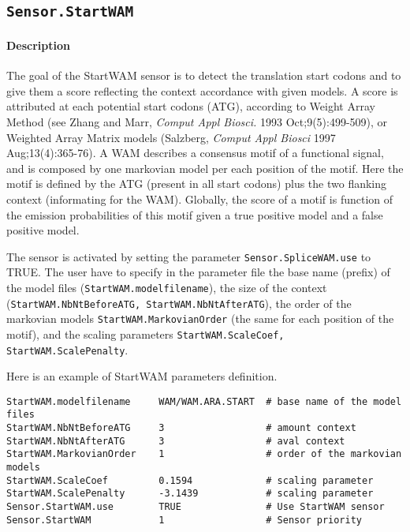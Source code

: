 
\subsection{\texttt{Sensor.StartWAM}}

\paragraph{Description}

The goal of the StartWAM sensor is to detect the translation start
codons and to give them a score reflecting the context accordance with
given models. A score is attributed at each potential start codons
(ATG), according to Weight Array Method (see Zhang and Marr, {\em
  Comput Appl Biosci.} 1993 Oct;9(5):499-509), or Weighted Array
Matrix models (Salzberg, {\em Comput Appl Biosci} 1997
Aug;13(4):365-76). A WAM describes a consensus motif of a functional
signal, and is composed by one markovian model per each position of
the motif. Here the motif is defined by the ATG (present in all start
codons) plus the two flanking context (informating for the WAM).
Globally, the score of a motif is function of the emission
probabilities of this motif given a true positive model and a false
positive model.

The sensor is activated by setting the parameter
\texttt{Sensor.SpliceWAM.use} to TRUE.  The user have to specify in
the parameter file the base name (prefix) of the model files
(\texttt{StartWAM.modelfilename}), the size of the context
(\texttt{StartWAM.NbNtBeforeATG, StartWAM.NbNtAfterATG}), the order of
the markovian models \texttt{StartWAM.MarkovianOrder} (the same for
each position of the motif), and the scaling parameters
\texttt{StartWAM.ScaleCoef, StartWAM.ScalePenalty}.

Here is an example of StartWAM parameters definition.
\begin{Verbatim}[fontsize=\small]
StartWAM.modelfilename     WAM/WAM.ARA.START  # base name of the model files
StartWAM.NbNtBeforeATG     3                  # amount context
StartWAM.NbNtAfterATG      3                  # aval context
StartWAM.MarkovianOrder    1                  # order of the markovian models
StartWAM.ScaleCoef         0.1594             # scaling parameter
StartWAM.ScalePenalty      -3.1439            # scaling parameter
Sensor.StartWAM.use        TRUE               # Use StartWAM sensor
Sensor.StartWAM            1                  # Sensor priority
\end{Verbatim}

